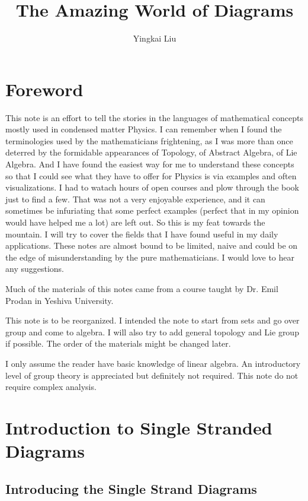 \documentclass[10pt,a4paper]{article}
\begin{document}
	\title{The Amazing World of Diagrams}
	\author{Yingkai Liu}
	\maketitle
	\tableofcontents
	
	\pagebreak
	\section*{Foreword }
	
	This note is an effort to tell the stories in the languages of mathematical concepts mostly used in condensed matter Physics. I can remember when I found the terminologies used by the mathematicians frightening, as I was more than once deterred by the formidable appearances of Topology, of Abstract Algebra, of Lie Algebra. And I have found the easiest way for me to understand these concepts so that I could see what they have to offer for Physics is via examples and often visualizations. I had to watach hours of open courses and plow through the book just to find a few. That was not a very enjoyable experience, and it can sometimes be infuriating that some perfect examples (perfect that in my opinion would have helped me a lot) are left out. So this is my feat towards the mountain. I will try to cover the fields that I have found useful in my daily applications. These notes are almost bound to be limited, naive and could be on the edge of misunderstanding by the pure mathematicians. I would love to hear any suggestions. 
	
	Much of the materials of this notes came from a course taught by Dr. Emil Prodan in Yeshiva University.
	
	This note is to be reorganized. I intended the note to start from sets and go over group and come to algebra. I will also try to add general topology and Lie group if possible. The order of the materials might be changed later.
	
	I only assume the reader have basic knowledge of linear algebra. An introductory level of group theory is appreciated but definitely not required. This note do not require complex analysis.
	
	\section{Introduction to Single Stranded Diagrams}
	
	\subsection{Introducing the Single Strand Diagrams}
	
\end{document}
